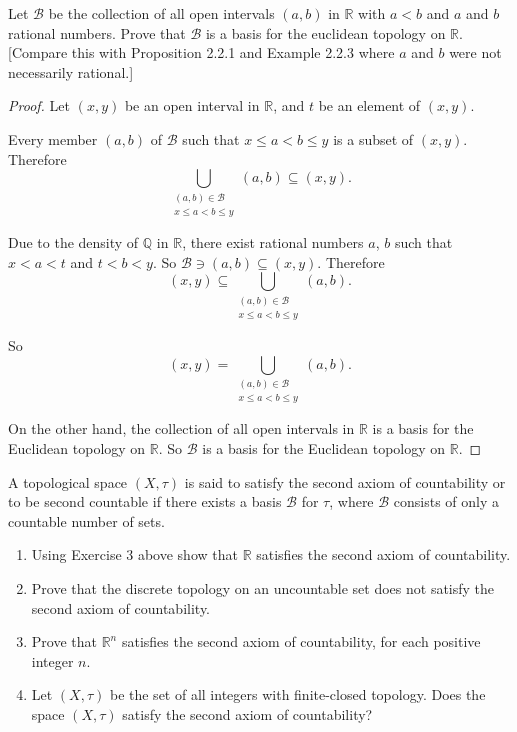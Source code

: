 \begin{exercise}
    Let $\mathcal{B}$ be the collection of all open intervals $(a, b)$ in $\mathbb{R}$ with $a < b$ and $a$ and $b$ rational numbers. Prove that $\mathcal{B}$ is a basis for the euclidean topology on $\mathbb{R}$. [Compare this with Proposition 2.2.1 and Example 2.2.3 where $a$ and $b$ were not necessarily rational.]
\end{exercise}

\begin{proof}
    Let $(x, y)$ be an open interval in $\mathbb{R}$, and $t$ be an element of $(x, y)$.

    Every member $(a, b)$ of $\mathcal{B}$ such that $x\leq a < b \leq y$ is a subset of $(x, y)$. Therefore
    \[
        \bigcup_{\substack{(a, b)\in\mathcal{B} \\ x\leq a < b\leq y }} (a, b) \subseteq (x, y).
    \]

    Due to the density of $\mathbb{Q}$ in $\mathbb{R}$, there exist rational numbers $a$, $b$ such that $x < a < t$ and $t < b < y$. So $\mathcal{B}\ni (a, b)\subseteq (x, y)$. Therefore
    \[
        (x, y)\subseteq \bigcup_{\substack{(a, b)\in\mathcal{B} \\ x\leq a < b\leq y }} (a, b).
    \]

    So
    \[
        (x, y) = \bigcup_{\substack{(a, b)\in\mathcal{B} \\ x\leq a < b\leq y }} (a, b).
    \]

    On the other hand, the collection of all open intervals in $\mathbb{R}$ is a basis for the Euclidean topology on $\mathbb{R}$. So $\mathcal{B}$ is a basis for the Euclidean topology on $\mathbb{R}$.
\end{proof}
\newpage

\begin{exercise}
    A topological space $(X, \tau)$ is said to satisfy the {\color{red}second axiom of countability} or to be {\color{red}second countable} if there exists a basis $\mathcal{B}$ for $\tau$, where $\mathcal{B}$ consists of only a countable number of sets.
    \begin{enumerate}[label={(\roman*)}]
        \item Using Exercise 3 above show that $\mathbb{R}$ satisfies the second axiom of countability.
        \item Prove that the discrete topology on an uncountable set does not satisfy the second axiom of countability.
        \item Prove that $\mathbb{R}^{n}$ satisfies the second axiom of countability, for each positive integer $n$.
        \item Let $(X, \tau)$ be the set of all integers with finite-closed topology. Does the space $(X, \tau)$ satisfy the second axiom of countability?
    \end{enumerate}
\end{exercise}

